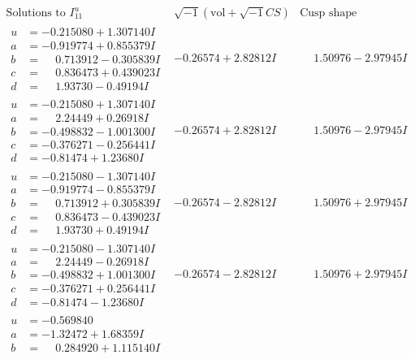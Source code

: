 \documentclass[1p]{elsarticle_modified}
\theoremstyle{definition}
\newcommand{\I}{\sqrt{-1}}
\begin{document}
$$\begin{array}{c|c|c}  
\text{Solutions to }I^u_{11}& \I (\text{vol} + \sqrt{-1}CS) & \text{Cusp shape}\\
 \hline 
\begin{aligned}
u &= -0.215080 + 1.307140 I \\
a &= -0.919774 + 0.855379 I \\
b &= \phantom{-}0.713912 - 0.305839 I \\
c &= \phantom{-}0.836473 + 0.439023 I \\
d &= \phantom{-}1.93730 - 0.49194 I\end{aligned}
 & -0.26574 + 2.82812 I & \phantom{-}1.50976 - 2.97945 I \\ \hline\begin{aligned}
u &= -0.215080 + 1.307140 I \\
a &= \phantom{-}2.24449 + 0.26918 I \\
b &= -0.498832 - 1.001300 I \\
c &= -0.376271 - 0.256441 I \\
d &= -0.81474 + 1.23680 I\end{aligned}
 & -0.26574 + 2.82812 I & \phantom{-}1.50976 - 2.97945 I \\ \hline\begin{aligned}
u &= -0.215080 - 1.307140 I \\
a &= -0.919774 - 0.855379 I \\
b &= \phantom{-}0.713912 + 0.305839 I \\
c &= \phantom{-}0.836473 - 0.439023 I \\
d &= \phantom{-}1.93730 + 0.49194 I\end{aligned}
 & -0.26574 - 2.82812 I & \phantom{-}1.50976 + 2.97945 I \\ \hline\begin{aligned}
u &= -0.215080 - 1.307140 I \\
a &= \phantom{-}2.24449 - 0.26918 I \\
b &= -0.498832 + 1.001300 I \\
c &= -0.376271 + 0.256441 I \\
d &= -0.81474 - 1.23680 I\end{aligned}
 & -0.26574 - 2.82812 I & \phantom{-}1.50976 + 2.97945 I \\ \hline\begin{aligned}
u &= -0.569840\phantom{ +0.000000I} \\
a &= -1.32472 + 1.68359 I \\
b &= \phantom{-}0.284920 + 1.115140 I \\

\end{aligned}
\end{array}$$
\end{document}
